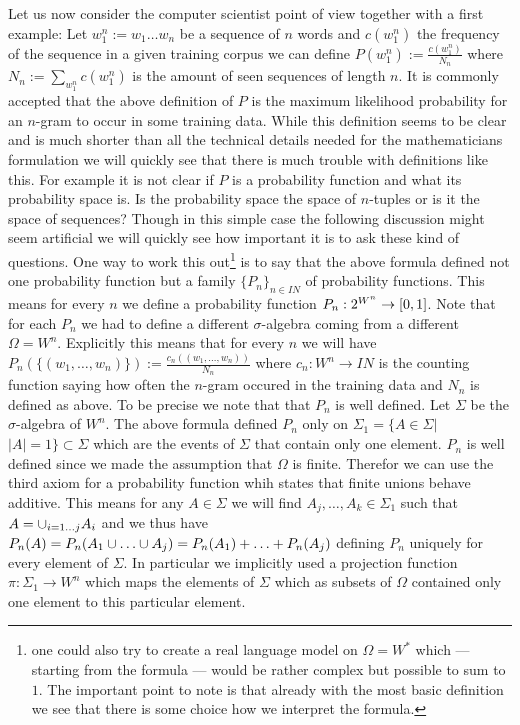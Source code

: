 \documentclass[•]{book}
\begin{document}
Let us now consider the computer scientist point of view together with a first example:
Let $w_1^n:=w_1\dots w_n$ be a sequence of $n$ words and $c(w_1^n)$ the frequency of the sequence in a given training corpus we can define $P(w_1^n):=\frac{c(w_1^n)}{N_n}$ where $N_n:=\sum_{w_1^n}c(w_1^n)$ is the amount of seen sequences of length $n$.
It is commonly accepted that the above definition of $P$ is the maximum likelihood probability for an $n$-gram to occur in some training data.
While this definition seems to be clear and is much shorter than all the technical details needed for the mathematicians formulation we will quickly see that there is much trouble with definitions like this.
For example it is not clear if $P$ is a probability function and what its probability space is.
Is the probability space the space of $n$-tuples or is it the space of sequences?
Though in this simple case the following discussion might seem artificial we will quickly see how important it is to ask these kind of questions.
One way to work this out\footnote{one could also try to create a real language model on $\Omega=W^*$ which --- starting from the formula --- would be rather complex but possible to sum to $1$. The important point to note is that already with the most basic definition we see that there is some choice how we interpret the formula.} is to say that the above formula defined not one probability function but a family $\{P_n\}_{n\in IN}$ of probability functions. 
This means for every $n$ we define a probability function $P_n:2^{W^n}\to[0,1]$.
Note that for each $P_n$ we had to define a different $\sigma$-algebra coming from a different $\Omega=W^n$. 
Explicitly this means that for every $n$ we will have $P_n(\{(w_1,\dots,w_n)\}):=\frac{c_n((w_1,\dots,w_n))}{N_n}$ where $c_n:W^n\to IN$ is the counting function saying how often the $n$-gram occured in the training data and $N_n$ is defined as above.
To be precise we note that that $P_n$ is well defined. Let $\Sigma$ be the $\sigma$-algebra of $W^n$. 
The above formula defined $P_n$ only on $\Sigma_1=\{A\in\Sigma|$ $|A| = 1\}\subset \Sigma$ which are the events of $\Sigma$ that contain only one element.
$P_n$ is well defined since we made the assumption that $\Omega$ is finite. 
Therefor we can use the third axiom for a probability function whih states that finite unions behave additive. 
This means for any $A\in\Sigma$ we will find $A_j,\dots,A_k\in\Sigma_1$ such that $A=\cup_{i=1\dots j}A_i$ and we thus have $P_n(A)=P_n(A_1 \cup \ldots \cup A_j) = P_n(A_1) + \ldots + P_n(A_j)$ defining $P_n$ uniquely for every element of $\Sigma$.
 In particular we implicitly used a projection function $\pi:\Sigma_1\to W^n$  which maps the elements of $\Sigma$ which as subsets of $\Omega$ contained only one element to this particular element.
\end{document}

